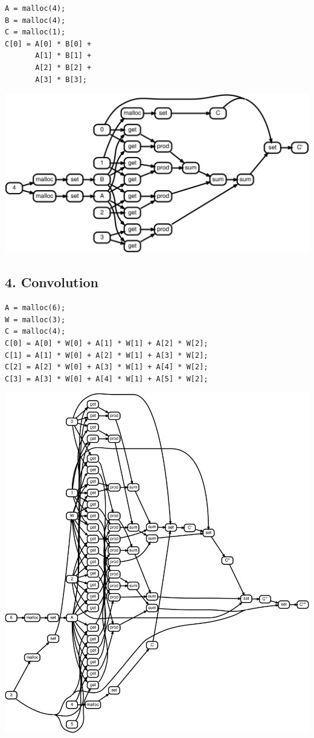 \documentclass[11pt]{article}
\begin{document}
\begin{lstlisting}
A = malloc(4);
B = malloc(4);
C = malloc(1);
C[0] = A[0] * B[0] +
       A[1] * B[1] +
       A[2] * B[2] +
       A[3] * B[3];
\end{lstlisting}

\includegraphics[scale=0.25]{rtd33}

\pagebreak\subsection*{4. Convolution}

\begin{lstlisting}
A = malloc(6);
W = malloc(3);
C = malloc(4);
C[0] = A[0] * W[0] + A[1] * W[1] + A[2] * W[2];
C[1] = A[1] * W[0] + A[2] * W[1] + A[3] * W[2];
C[2] = A[2] * W[0] + A[3] * W[1] + A[4] * W[2];
C[3] = A[3] * W[0] + A[4] * W[1] + A[5] * W[2];
\end{lstlisting}

\includegraphics[scale=0.25]{rtd34}
\end{document}

